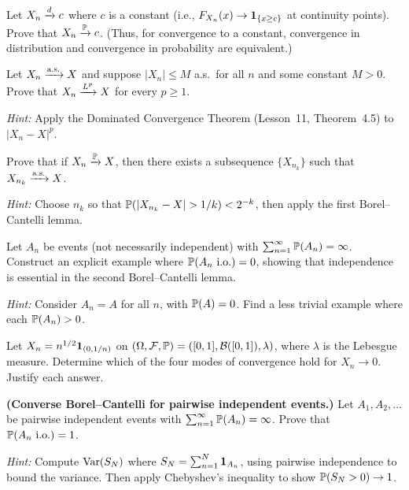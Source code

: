 \documentclass[11pt,a4paper]{article}
\begin{document}
\begin{exercise}[(*)]
\label{ex:conv_constant}
Let $X_n \xrightarrow{d} c$ where $c$ is a constant (i.e., $F_{X_n}(x) \to
\mathbf{1}_{\{x \geq c\}}$ at continuity points).  Prove that
$X_n \xrightarrow{\mathbb{P}} c$.  (Thus, for convergence to a constant, convergence
in distribution and convergence in probability are equivalent.)
\end{exercise}

\begin{exercise}[(*)]
\label{ex:lp_bounded}
Let $X_n \xrightarrow{\text{a.s.}} X$ and suppose $|X_n| \leq M$ a.s.\ for all $n$
and some constant $M > 0$.  Prove that $X_n \xrightarrow{L^{p}} X$ for every
$p \geq 1$.

\noindent\textit{Hint:} Apply the Dominated Convergence Theorem
(Lesson~11, Theorem~4.5) to $|X_n - X|^p$.
\end{exercise}

\begin{exercise}[(**)]
\label{ex:subsequence}
Prove that if $X_n \xrightarrow{\mathbb{P}} X$, then there exists a subsequence
$\{X_{n_k}\}$ such that $X_{n_k} \xrightarrow{\text{a.s.}} X$.

\noindent\textit{Hint:} Choose $n_k$ so that
$\mathbb{P}(|X_{n_k} - X| > 1/k) < 2^{-k}$, then apply the first
Borel--Cantelli lemma.
\end{exercise}

\begin{exercise}[(**)]
\label{ex:bc_dependent}
Let $A_n$ be events (not necessarily independent) with
$\sum_{n=1}^\infty \mathbb{P}(A_n) = \infty$.  Construct an explicit
example where $\mathbb{P}(A_n \text{ i.o.}) = 0$, showing that
independence is essential in the second Borel--Cantelli lemma.

\noindent\textit{Hint:} Consider $A_n = A$ for all $n$, with
$\mathbb{P}(A) = 0$.  Find a less trivial example where each
$\mathbb{P}(A_n) > 0$.
\end{exercise}

\begin{exercise}[(**)]
\label{ex:convergence_diagram}
Let $X_n = n^{1/2} \mathbf{1}_{(0, 1/n)}$ on $(\Omega, \mathcal{F},
\mathbb{P}) = ([0,1], \mathcal{B}([0,1]), \lambda)$, where $\lambda$ is the
Lebesgue measure.  Determine which of the four modes of convergence
hold for $X_n \to 0$.  Justify each answer.
\end{exercise}

\begin{exercise}[(***)]
\label{ex:bc_converse}
\textbf{(Converse Borel--Cantelli for pairwise independent events.)}
Let $A_1, A_2, \ldots$ be pairwise independent events with
$\sum_{n=1}^\infty \mathbb{P}(A_n) = \infty$.  Prove that
$\mathbb{P}(A_n \text{ i.o.}) = 1$.

\noindent\textit{Hint:} Compute $\operatorname{Var}(S_N)$ where
$S_N = \sum_{n=1}^N \mathbf{1}_{A_n}$, using pairwise independence
to bound the variance.  Then apply Chebyshev's inequality to show
$\mathbb{P}(S_N > 0) \to 1$.
\end{exercise}
\end{document}
